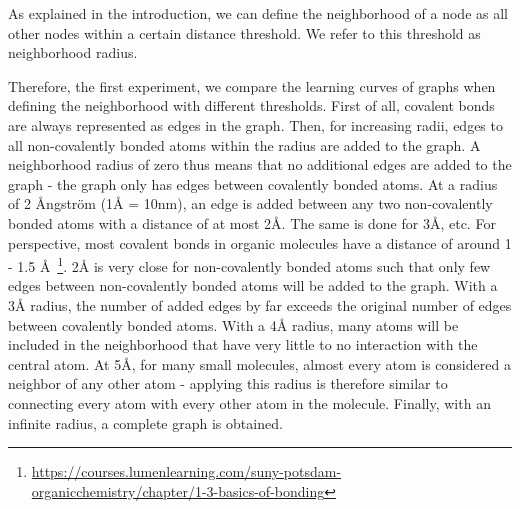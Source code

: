 
As explained in the introduction, we can define the neighborhood of a node as all other nodes within a certain distance threshold. We refer to this threshold as neighborhood radius.

Therefore, the first experiment, we compare the learning curves of graphs when defining the neighborhood with different thresholds. First of all, covalent bonds are always represented as edges in the graph. Then, for increasing radii, edges to all non-covalently bonded atoms within the radius are added to the graph. A neighborhood radius of zero thus means that no additional edges are added to the graph - the graph only has edges between covalently bonded atoms. At a radius of 2 Ångström (1Å = 10nm), an edge is added between any two non-covalently bonded atoms with a distance of at most 2Å. The same is done for 3Å, etc. For perspective, most covalent bonds in organic molecules have a distance of around 1 - 1.5 Å~\footnote{\url{https://courses.lumenlearning.com/suny-potsdam-organicchemistry/chapter/1-3-basics-of-bonding}}. 2Å is very close for non-covalently bonded atoms such that only few edges between non-covalently bonded atoms will be added to the graph. With a 3Å radius, the number of added edges by far exceeds the original number of edges between covalently bonded atoms. With a 4Å radius, many atoms will be included in the neighborhood that have very little to no interaction with the central atom. At 5Å, for many small molecules, almost every atom is considered a neighbor of any other atom - applying this radius is therefore similar to connecting every atom with every other atom in the molecule. Finally, with an infinite radius, a complete graph is obtained.

